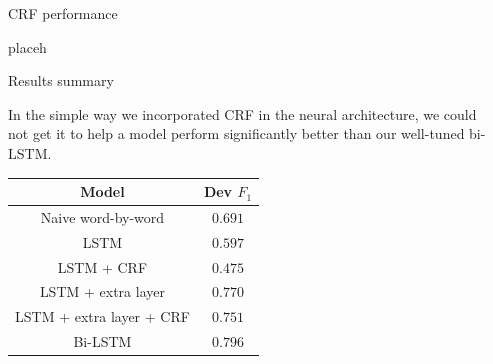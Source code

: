 \documentclass[final]{beamer}
\newlength{\sepwid}
\newlength{\onecolwid}
\begin{document}
\begin{frame}[t]
\begin{columns}[t]
\begin{column}{\sepwid}\end{column} %

\begin{column}{\onecolwid} %


\begin{block}{CRF performance}

placeh

\end{block}






\begin{block}{Results summary}

In the simple way we incorporated CRF in the neural architecture, we could not get it to help a model perform significantly better than our well-tuned bi-LSTM.

\vspace{10px}

\begin{center}
   \begin{tabular}{||c | c||}
   \hline
   \textbf{Model}  & \textbf{Dev $F_1$} \\
   \hline\hline
   Naive word-by-word & $0.691$ \\
   \hline
   LSTM & $0.597$ \\
   \hline
   LSTM + CRF & $0.475$ \\
   \hline
   LSTM + extra layer & $0.770$ \\
   \hline
   LSTM + extra layer + CRF & $0.751$ \\
   \hline
   Bi-LSTM & $0.796$ \\ [1ex]
   \hline
  \end{tabular}
\end{center}



\end{block}
\end{column}
\end{columns}
\end{frame}
\end{document}

